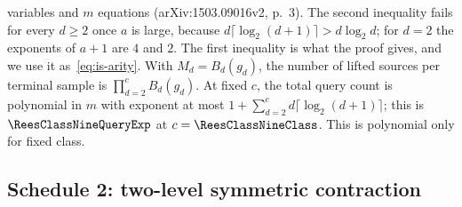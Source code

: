 variables and $m$ equations (arXiv:1503.09016v2, p.~3). The second inequality fails for every $d \ge 2$ once $a$ is large, because $d\lceil\log_2(d+1)\rceil > d\log_2 d$; for $d = 2$ the exponents of $a+1$ are $4$ and $2$. The first inequality is what the proof gives, and we use it as~\eqref{eq:is-arity}. With $M_d = B_d(g_d)$, the number of lifted sources per terminal sample is $\prod_{d=2}^c B_d(g_d)$. At fixed $c$, the total query count is polynomial in $m$ with exponent at most $1 + \sum_{d=2}^c d\lceil\log_2(d+1)\rceil$; this is $\ReesClassNineQueryExp$ at $c = \ReesClassNineClass$. This is polynomial only for fixed class.

\subsection{Schedule 2: two-level symmetric contraction}
\label{sec:schedule2}

